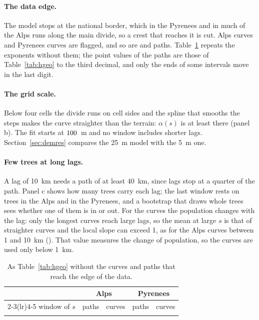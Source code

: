 \paragraph{The data edge.} The model stops at the national border, which in the Pyrenees and in much of the Alps runs along the main divide, so a crest that reaches it is cut. \CgAlpsEdgeCurves{} Alps curves and
\CgPyrEdgeCurves{} Pyrenees curves are flagged, and so are \CgAlpsEdgePaths{} and \CgPyrEdgePaths{} paths. Table~\ref{tab:noedge} repeats the exponents without them; the point values of the paths are those of Table~\ref{tab:hgeo} to the third decimal, and only the ends of some intervals move in the last digit.

\paragraph{The grid scale.} Below four cells the divide runs on cell sides and the spline that smooths the steps makes the curve straighter than the terrain: $\alpha(s)$ is at least \CgGridAlphaMin{} there (panel b). The fit starts at
$100$~m and no window includes shorter lags. Section~\ref{sec:demres} compares the 25~m model with the 5~m one.

\paragraph{Few trees at long lags.} A lag of 10~km needs a path of at least 40~km, since lags stop at a quarter of the path. Panel c shows how many trees carry each lag; the last window rests on \CgAlpsTreesTenKm{} trees in the Alps and
\CgPyrTreesTenKm{} in the Pyrenees, and a bootstrap that draws whole trees sees whether one of them is in or out. For the curves the population changes with the lag: only the longest curves reach large lags, so the mean at large $s$
is that of straighter curves and the local slope can exceed 1, as for the Alps curves between 1 and 10~km (\CgAlpsCurvesMid). That value measures the change of population, so the curves are used only below 1~km.

\begin{table}[H]
\centering
\caption{As Table~\ref{tab:hgeo} without the curves and paths that reach the edge of the data.}
\label{tab:noedge}
\small
\setlength{\tabcolsep}{4pt}
\begin{tabular}{lllll}
\toprule
 & \multicolumn{2}{c}{Alps} & \multicolumn{2}{c}{Pyrenees} \\
\cmidrule(lr){2-3}\cmidrule(lr){4-5}
window of $s$ & paths & curves & paths & curves \\
\midrule
\\
\bottomrule
\end{tabular}
\end{table}

